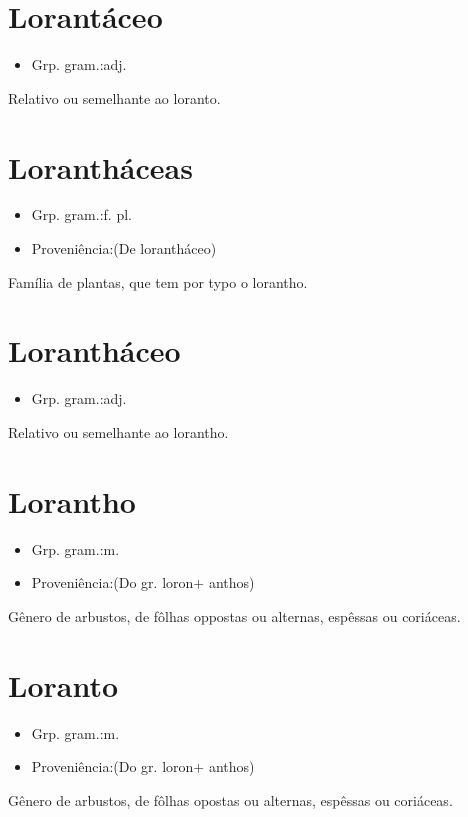 \section{Lorantáceo}
\begin{itemize}
\item {Grp. gram.:adj.}
\end{itemize}
Relativo ou semelhante ao loranto.
\section{Lorantháceas}
\begin{itemize}
\item {Grp. gram.:f. pl.}
\end{itemize}
\begin{itemize}
\item {Proveniência:(De \textunderscore lorantháceo\textunderscore )}
\end{itemize}
Família de plantas, que tem por typo o lorantho.
\section{Lorantháceo}
\begin{itemize}
\item {Grp. gram.:adj.}
\end{itemize}
Relativo ou semelhante ao lorantho.
\section{Lorantho}
\begin{itemize}
\item {Grp. gram.:m.}
\end{itemize}
\begin{itemize}
\item {Proveniência:(Do gr. \textunderscore loron\textunderscore  + \textunderscore anthos\textunderscore )}
\end{itemize}
Gênero de arbustos, de fôlhas oppostas ou alternas, espêssas ou coriáceas.
\section{Loranto}
\begin{itemize}
\item {Grp. gram.:m.}
\end{itemize}
\begin{itemize}
\item {Proveniência:(Do gr. \textunderscore loron\textunderscore  + \textunderscore anthos\textunderscore )}
\end{itemize}
Gênero de arbustos, de fôlhas opostas ou alternas, espêssas ou coriáceas.
